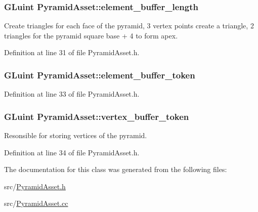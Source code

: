 \subsubsection[{element\+\_\+buffer\+\_\+length}]{\setlength{\rightskip}{0pt plus 5cm}G\+Luint Pyramid\+Asset\+::element\+\_\+buffer\+\_\+length\hspace{0.3cm}{\ttfamily [private]}}\label{class_pyramid_asset_a5566105859271b493eab3b5f9c02f866}
Create triangles for each face of the pyramid, 3 vertex points create a triangle, 2 triangles for the pyramid square base + 4 to form apex. 

Definition at line 31 of file Pyramid\+Asset.\+h.

\hypertarget{class_pyramid_asset_a6f7e2f50904d2941e33df8eb7f5f9c2d}{}
\subsubsection[{element\+\_\+buffer\+\_\+token}]{\setlength{\rightskip}{0pt plus 5cm}G\+Luint Pyramid\+Asset\+::element\+\_\+buffer\+\_\+token\hspace{0.3cm}{\ttfamily [private]}}\label{class_pyramid_asset_a6f7e2f50904d2941e33df8eb7f5f9c2d}


Definition at line 33 of file Pyramid\+Asset.\+h.

\hypertarget{class_pyramid_asset_a54d9cec42bc77d07a66e6c1cd55049b0}{}
\subsubsection[{vertex\+\_\+buffer\+\_\+token}]{\setlength{\rightskip}{0pt plus 5cm}G\+Luint Pyramid\+Asset\+::vertex\+\_\+buffer\+\_\+token\hspace{0.3cm}{\ttfamily [private]}}\label{class_pyramid_asset_a54d9cec42bc77d07a66e6c1cd55049b0}
Resonsible for storing vertices of the pyramid. 

Definition at line 34 of file Pyramid\+Asset.\+h.



The documentation for this class was generated from the following files\+:\begin{DoxyCompactItemize}
\item 
src/\hyperlink{_pyramid_asset_8h}{Pyramid\+Asset.\+h}\item 
src/\hyperlink{_pyramid_asset_8cc}{Pyramid\+Asset.\+cc}\end{DoxyCompactItemize}
